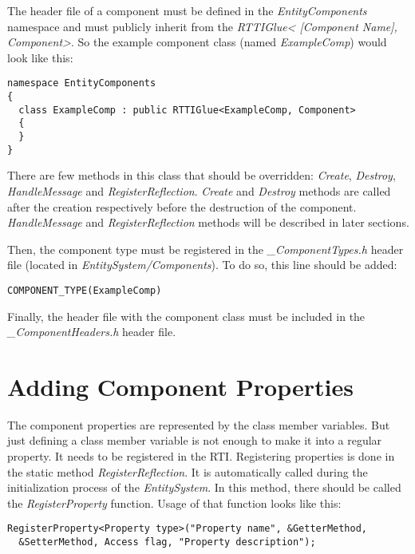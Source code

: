 \documentclass[a4paper, 12pt]{report}
\begin{document}
The header file of a component must be defined in the \emph{EntityComponents} namespace and must publicly inherit from the  \emph{RTTIGlue< [Component Name], Component>}. So the example component class (named \emph{ExampleComp}) would look like this:

\footnotesize 
\begin{verbatim}
namespace EntityComponents
{
  class ExampleComp : public RTTIGlue<ExampleComp, Component>
  {
  }
}
\end{verbatim}
\normalsize

There are few methods in this class that should be overridden: \emph{Create}, \emph{Destroy}, \emph{HandleMessage} and \emph{RegisterReflection}. \emph{Create} and \emph{Destroy} methods are called after the creation respectively before the destruction of the component. \emph{HandleMessage} and \emph{RegisterReflection} methods will be described in later sections.

Then, the component type must be registered in the \emph{\_ComponentTypes.h} header file (located in \emph{EntitySystem/Components}). To do so, this line should be added:
\footnotesize 
\begin{verbatim}
COMPONENT_TYPE(ExampleComp)
\end{verbatim}
\normalsize

Finally, the header file with the component class must be included in the \emph{\_ComponentHeaders.h} header file.

\section{Adding Component Properties}

The component properties are represented by the class member variables. But just defining a class member variable is not enough to make it into a regular property. It needs to be registered in the RTI. Registering properties is done in the static method \emph{RegisterReflection}. It is automatically called during the initialization process of the \emph{EntitySystem}. In this method, there should be called the \emph{RegisterProperty} function. Usage of that function looks like this:

\footnotesize 
\begin{verbatim}
RegisterProperty<Property type>("Property name", &GetterMethod, 
  &SetterMethod, Access flag, "Property description");
\end{verbatim}
\normalsize
\end{document}
